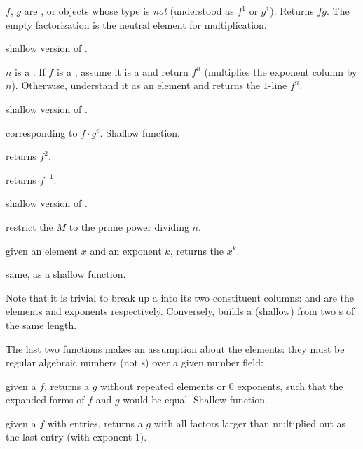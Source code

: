  $f$, $g$ are ,
or objects whose type is \emph{not}  (understood as $f^1$ or $g^1$).
Returns $fg$. The empty factorization is the neutral element for 
multiplication.

 shallow version of .

 $n$ is a . If $f$ is a ,
assume it is a  and return $f^n$ (multiplies the exponent column
by $n$). Otherwise, understand it as an element and returns the $1$-line
 $f^n$.

 shallow version of .

 
corresponding to $f \cdot g^e$. Shallow function.

 returns $f^2$.

 returns $f^{-1}$.

 shallow version of .

 restrict the  $M$ to
the prime power dividing $n$.

 given an element $x$ and an exponent
$k$, returns the  $x^k$.

 same, as a shallow function.

Note that it is trivial to break up a  into its two constituent
columns:  and  are the elements and exponents
respectively. Conversely,  builds a (shallow)  from
two s of the same length.

The last two functions makes an assumption about the elements: they must be
regular algebraic numbers (not s) over a given number field:

 given a  $f$, returns a 
$g$ without repeated elements or 0 exponents, such that the expanded forms
of $f$ and $g$ would be equal. Shallow function.

 given a  $f$ with
 entries, returns a  $g$ with all factors larger than
 multiplied out as the last entry (with exponent $1$).

